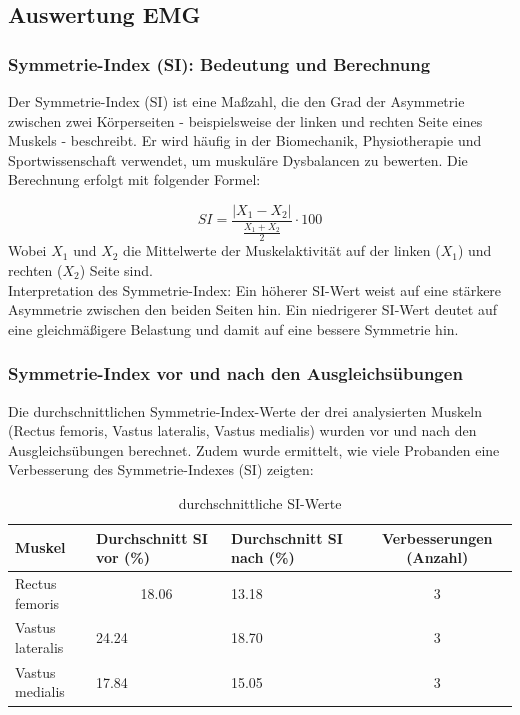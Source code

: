 \subsection{Auswertung EMG}
\subsubsection{Symmetrie-Index (SI): Bedeutung und Berechnung}

Der Symmetrie-Index (SI) ist eine Maßzahl, die den Grad der Asymmetrie zwischen zwei Körperseiten - beispielsweise der linken und rechten Seite eines Muskels - beschreibt. Er wird häufig in der Biomechanik, Physiotherapie und Sportwissenschaft verwendet, um muskuläre Dysbalancen zu bewerten.
Die Berechnung erfolgt mit folgender Formel:

\begin{equation}
    SI = \frac{|X_1 - X_2|}{\frac{X_1 + X_2}{2}} \cdot 100
\end{equation}
Wobei $X_1$ und $X_2$ die Mittelwerte der Muskelaktivität auf der linken ($X_1$) und rechten ($X_2$) Seite sind.
\\
Interpretation des Symmetrie-Index:
Ein höherer SI-Wert weist auf eine stärkere Asymmetrie zwischen den beiden Seiten hin.
Ein niedrigerer SI-Wert deutet auf eine gleichmäßigere Belastung und damit auf eine bessere Symmetrie hin.

\subsubsection{Symmetrie-Index vor und nach den Ausgleichsübungen}

Die durchschnittlichen Symmetrie-Index-Werte der drei analysierten Muskeln (Rectus femoris, Vastus lateralis, Vastus medialis) wurden vor und nach den Ausgleichsübungen berechnet. Zudem wurde ermittelt, wie viele Probanden eine Verbesserung des Symmetrie-Indexes (SI) zeigten:

\begin{table}[htbp]
    \centering
      \begin{tabular}{|p{8.455em}|p{5.135em}|p{5.135em}|c|}
      \hline
      \textbf{Muskel} & \textbf{Durchschnitt SI vor (\%)} & \textbf{Durchschnitt SI nach (\%)} & \multicolumn{1}{p{5.135em}|}{\textbf{Verbesserungen (Anzahl)}} \\
      \hline
      Rectus femoris & \multicolumn{1}{c|}{18.06} & 13.18 & 3 \\
      \hline
      Vastus lateralis & 24.24 & 18.70 & 3 \\
      \hline
      Vastus medialis & 17.84 & 15.05 & 3 \\
      \hline
      \end{tabular}%
      \caption{durchschnittliche SI-Werte}
    \label{tab:durchschnittliche-SI-Werte}%
  \end{table}%

